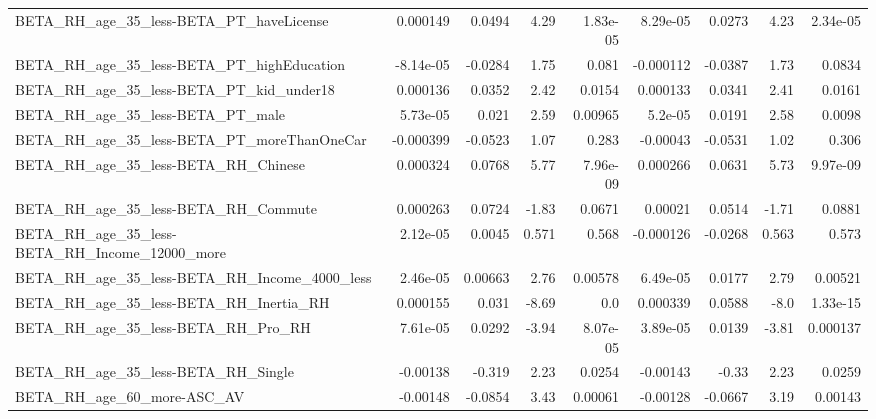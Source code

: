 \begin{tabular}{lrrrrrrrr}
BETA\_RH\_age\_35\_less-BETA\_PT\_haveLicense            &    0.000149 &       0.0494 &     4.29 & 1.83e-05 &   8.29e-05 &      0.0273 &         4.23 &      2.34e-05 \\
BETA\_RH\_age\_35\_less-BETA\_PT\_highEducation          &   -8.14e-05 &      -0.0284 &     1.75 &    0.081 &  -0.000112 &     -0.0387 &         1.73 &        0.0834 \\
BETA\_RH\_age\_35\_less-BETA\_PT\_kid\_under18            &    0.000136 &       0.0352 &     2.42 &   0.0154 &   0.000133 &      0.0341 &         2.41 &        0.0161 \\
BETA\_RH\_age\_35\_less-BETA\_PT\_male                   &    5.73e-05 &        0.021 &     2.59 &  0.00965 &    5.2e-05 &      0.0191 &         2.58 &        0.0098 \\
BETA\_RH\_age\_35\_less-BETA\_PT\_moreThanOneCar         &   -0.000399 &      -0.0523 &     1.07 &    0.283 &   -0.00043 &     -0.0531 &         1.02 &         0.306 \\
BETA\_RH\_age\_35\_less-BETA\_RH\_Chinese                &    0.000324 &       0.0768 &     5.77 & 7.96e-09 &   0.000266 &      0.0631 &         5.73 &      9.97e-09 \\
BETA\_RH\_age\_35\_less-BETA\_RH\_Commute                &    0.000263 &       0.0724 &    -1.83 &   0.0671 &    0.00021 &      0.0514 &        -1.71 &        0.0881 \\
BETA\_RH\_age\_35\_less-BETA\_RH\_Income\_12000\_more      &    2.12e-05 &       0.0045 &    0.571 &    0.568 &  -0.000126 &     -0.0268 &        0.563 &         0.573 \\
BETA\_RH\_age\_35\_less-BETA\_RH\_Income\_4000\_less       &    2.46e-05 &      0.00663 &     2.76 &  0.00578 &   6.49e-05 &      0.0177 &         2.79 &       0.00521 \\
BETA\_RH\_age\_35\_less-BETA\_RH\_Inertia\_RH             &    0.000155 &        0.031 &    -8.69 &      0.0 &   0.000339 &      0.0588 &         -8.0 &      1.33e-15 \\
BETA\_RH\_age\_35\_less-BETA\_RH\_Pro\_RH                 &    7.61e-05 &       0.0292 &    -3.94 & 8.07e-05 &   3.89e-05 &      0.0139 &        -3.81 &      0.000137 \\
BETA\_RH\_age\_35\_less-BETA\_RH\_Single                 &    -0.00138 &       -0.319 &     2.23 &   0.0254 &   -0.00143 &       -0.33 &         2.23 &        0.0259 \\
BETA\_RH\_age\_60\_more-ASC\_AV                         &    -0.00148 &      -0.0854 &     3.43 &  0.00061 &   -0.00128 &     -0.0667 &         3.19 &       0.00143 \\

\end{tabular}

